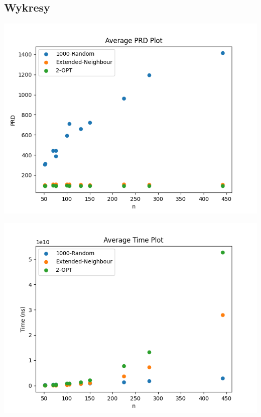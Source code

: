 \documentclass{article}
\begin{document}
\subsection{Wykresy}
\begin{center}
\includegraphics[width=\textwidth, 
                   height = 0.4\textheight, 
                   keepaspectratio]
                  {tsp_lib_prd} 
\end{center}
\begin{center}
\includegraphics[width=\textwidth, 
                   height = 0.4\textheight, 
                   keepaspectratio]
                  {tsp_lib_avg_time} 
\end{center}
\end{document}
